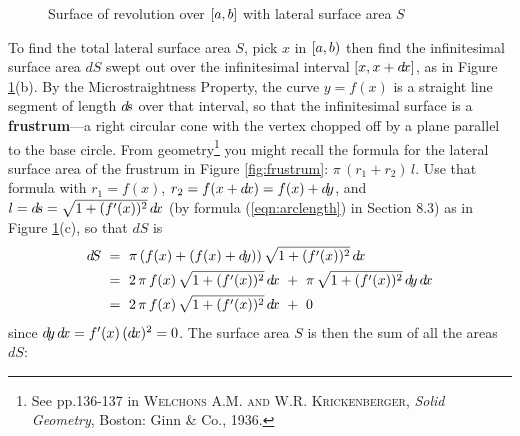 \begin{figure}[ht]
{}
 \quad
 \caption[]{\enskip Surface of revolution over $\lbrack a,b \rbrack$ with lateral surface area $S$}
 \label{fig:surfarea}
\end{figure}

\piccaption[]{\label{fig:frustrum}}
\noindent To find the total lateral surface area $S$, pick $x$ in
$\lbrack a,b )$ then find the infinitesimal surface area $d\!S$ swept out over
the infinitesimal interval $\lbrack x,x+d\!x \rbrack$, as in Figure \ref{fig:surfarea}(b).
By the Microstraightness Property, the curve $y=f(x)$ is a straight line segment
of length $d\!s$ over that interval, so that the infinitesimal surface is a
\textbf{frustrum}---a right circular cone with the vertex chopped off by a plane
parallel to the base circle. From geometry\footnote{See pp.136-137 in
\textsc{Welchons A.M. and W.R. Krickenberger}, \emph{Solid Geometry}, Boston:
Ginn \& Co., 1936.} you might recall the formula for the lateral surface area of
the frustrum in Figure \ref{fig:frustrum}: $\pi\,(r_1+r_2)\,l$.
Use that formula with $r_1=f(x)$, $r_2=f(x+d\!x)=f(x)+d\!y$, and
$l=d\!s=\sqrt{1 + (f'(x))^2}\,d\!x$ (by formula (\ref{eqn:arclength}) in Section
8.3) as in Figure \ref{fig:surfarea}(c), so that $d\!S$ is
\begin{align*}
d\!S ~&=~ \pi\,(f(x) + (f(x)+d\!y))\,\sqrt{1 + (f'(x))^2}\,d\!x\\
&=~ 2\,\pi\,f(x)\,\sqrt{1 + (f'(x))^2}\,d\!x ~+~ \pi\,\sqrt{1 + (f'(x))^2}\,d\!y\,d\!x\\
&=~ 2\,\pi\,f(x)\,\sqrt{1 + (f'(x))^2}\,d\!x ~+~ 0
\end{align*}
since $d\!y\,d\!x = f'(x)\,(d\!x)^2 = 0$.
The surface area $S$ is then the sum of all the areas $d\!S$:

